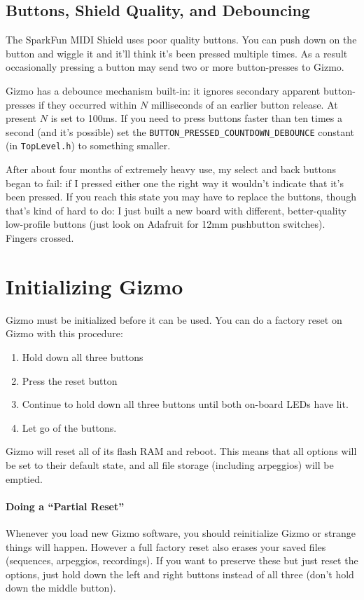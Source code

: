 \documentclass{article}
\begin{document}
\subsection{Buttons, Shield Quality, and Debouncing}
\label{debouncing}

The SparkFun MIDI Shield uses poor quality buttons.  You can push down on the button and wiggle it and it'll think it's been pressed multiple times.  As a result occasionally pressing a button may send two or more button-presses to Gizmo.

Gizmo has a debounce mechanism built-in: it ignores secondary apparent button-presses if they occurred within \(N\) milliseconds of an earlier button release.  At present \(N\) is set to 100ms.  If you need to press buttons faster than ten times a second (and it's possible) set the \texttt{BUTTON\_PRESSED\_COUNTDOWN\_DEBOUNCE} constant (in \texttt{TopLevel.h}) to something smaller.

After about four months of extremely heavy use, my select and back buttons began to fail: if I pressed either one the right way it wouldn't indicate that it's been pressed.  If you reach this state you may have to replace the buttons, though that's kind of hard to do: I just built a new board with different, better-quality low-profile buttons (just look on Adafruit for 12mm pushbutton switches).  Fingers crossed.

\clearpage
\section{Initializing Gizmo}

Gizmo must be initialized before it can be used.  You can do a factory reset on Gizmo with this procedure:

\begin{enumerate}
\item Hold down all three buttons
\item Press the reset button
\item Continue to hold down all three buttons until both on-board LEDs have lit.
\item Let go of the buttons.
\end{enumerate}

Gizmo will reset all of its flash RAM and reboot.  This means that all options will be set to their default state, and all file storage (including arpeggios) will be emptied.

\paragraph{Doing a ``Partial Reset''} Whenever you load new Gizmo software, you should reinitialize Gizmo or strange things will happen.  However a full factory reset also erases your saved files (sequences, arpeggios, recordings).  If you want to preserve these but just reset the options, just hold down the left and right buttons instead of all three (don't hold down the middle button).
\end{document}
